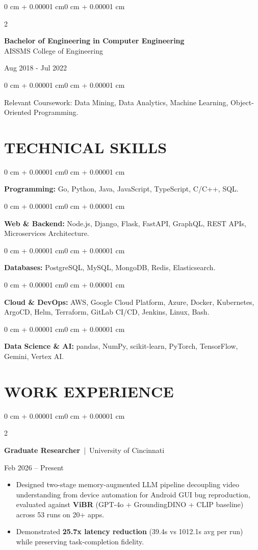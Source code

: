 \documentclass[10pt, letterpaper]{article}
\newenvironment{highlights}{
    \begin{itemize}[
        topsep=0.10 cm,
        parsep=0.06 cm,
        partopsep=0pt,
        itemsep=0.06 cm,
        leftmargin=12pt
    ]
}{
    \end{itemize}
}
\newenvironment{onecolentry}{
    \begin{adjustwidth}{0 cm + 0.00001 cm}{0 cm + 0.00001 cm}
}{
    \end{adjustwidth}
}
\newenvironment{twocolentry}[2][]{
    \onecolentry
    \def\secondColumn{#2}
    \setcolumnwidth{\fill, 4.5 cm}
    \begin{paracol}{2}
}{
    \switchcolumn \raggedleft \secondColumn
    \end{paracol}
    \endonecolentry
}
\begin{document}
\begin{twocolentry}{
    Aug 2018 - Jul 2022
}
    \textbf{Bachelor of Engineering in Computer Engineering} \\
    AISSMS College of Engineering
\end{twocolentry}
\begin{onecolentry}
Relevant Coursework: Data Mining, Data Analytics, Machine Learning, Object-Oriented Programming.
\end{onecolentry}
\section{TECHNICAL SKILLS}
\begin{onecolentry}
\textbf{Programming:} Go, Python, Java, JavaScript, TypeScript, C/C++, SQL.
\end{onecolentry}
\vspace{0.06 cm}
\begin{onecolentry}
\textbf{Web \& Backend:} Node.js, Django, Flask, FastAPI, GraphQL, REST APIs, Microservices Architecture.
\end{onecolentry}
\vspace{0.06 cm}
\begin{onecolentry}
\textbf{Databases:} PostgreSQL, MySQL, MongoDB, Redis, Elasticsearch.
\end{onecolentry}
\vspace{0.06 cm}
\begin{onecolentry}
\textbf{Cloud \& DevOps:} AWS, Google Cloud Platform, Azure, Docker, Kubernetes, ArgoCD, Helm, Terraform, GitLab CI/CD, Jenkins, Linux, Bash.
\end{onecolentry}
\vspace{0.06 cm}
\begin{onecolentry}
\textbf{Data Science \& AI:} pandas, NumPy, scikit-learn, PyTorch, TensorFlow, Gemini, Vertex AI.
\end{onecolentry}

\section{WORK EXPERIENCE}
\begin{twocolentry}{Feb 2026 -- Present}
\textbf{Graduate Researcher} \,|\, University of Cincinnati
\end{twocolentry}
\begin{highlights}
  \item Designed two-stage memory-augmented LLM pipeline decoupling video understanding from device automation for Android GUI bug reproduction, evaluated against \textbf{ViBR} (GPT-4o + GroundingDINO + CLIP baseline) across 53 runs on 20+ apps.
  \item Demonstrated \textbf{25.7x latency reduction} (39.4s vs 1012.1s avg per run) while preserving task-completion fidelity.
\end{highlights}
\end{document}
